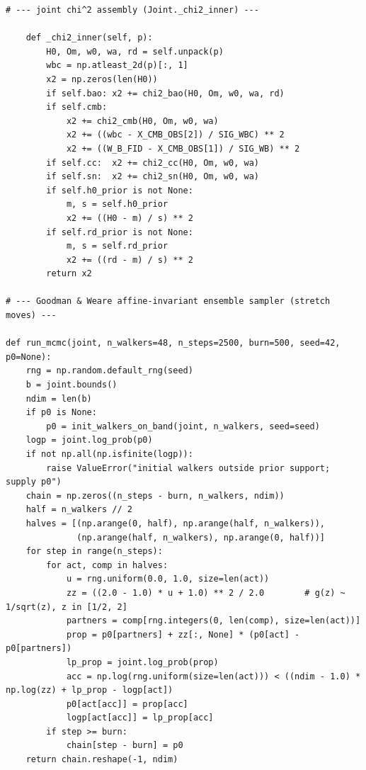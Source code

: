 \documentclass[aps,prd,preprint,superscriptaddress,nofootinbib]{revtex4-2}
\begin{document}
\begin{lstlisting}
# --- joint chi^2 assembly (Joint._chi2_inner) ---

    def _chi2_inner(self, p):
        H0, Om, w0, wa, rd = self.unpack(p)
        wbc = np.atleast_2d(p)[:, 1]
        x2 = np.zeros(len(H0))
        if self.bao: x2 += chi2_bao(H0, Om, w0, wa, rd)
        if self.cmb:
            x2 += chi2_cmb(H0, Om, w0, wa)
            x2 += ((wbc - X_CMB_OBS[2]) / SIG_WBC) ** 2
            x2 += ((W_B_FID - X_CMB_OBS[1]) / SIG_WB) ** 2
        if self.cc:  x2 += chi2_cc(H0, Om, w0, wa)
        if self.sn:  x2 += chi2_sn(H0, Om, w0, wa)
        if self.h0_prior is not None:
            m, s = self.h0_prior
            x2 += ((H0 - m) / s) ** 2
        if self.rd_prior is not None:
            m, s = self.rd_prior
            x2 += ((rd - m) / s) ** 2
        return x2

# --- Goodman & Weare affine-invariant ensemble sampler (stretch moves) ---

def run_mcmc(joint, n_walkers=48, n_steps=2500, burn=500, seed=42, p0=None):
    rng = np.random.default_rng(seed)
    b = joint.bounds()
    ndim = len(b)
    if p0 is None:
        p0 = init_walkers_on_band(joint, n_walkers, seed=seed)
    logp = joint.log_prob(p0)
    if not np.all(np.isfinite(logp)):
        raise ValueError("initial walkers outside prior support; supply p0")
    chain = np.zeros((n_steps - burn, n_walkers, ndim))
    half = n_walkers // 2
    halves = [(np.arange(0, half), np.arange(half, n_walkers)),
              (np.arange(half, n_walkers), np.arange(0, half))]
    for step in range(n_steps):
        for act, comp in halves:
            u = rng.uniform(0.0, 1.0, size=len(act))
            zz = ((2.0 - 1.0) * u + 1.0) ** 2 / 2.0        # g(z) ~ 1/sqrt(z), z in [1/2, 2]
            partners = comp[rng.integers(0, len(comp), size=len(act))]
            prop = p0[partners] + zz[:, None] * (p0[act] - p0[partners])
            lp_prop = joint.log_prob(prop)
            acc = np.log(rng.uniform(size=len(act))) < ((ndim - 1.0) * np.log(zz) + lp_prop - logp[act])
            p0[act[acc]] = prop[acc]
            logp[act[acc]] = lp_prop[acc]
        if step >= burn:
            chain[step - burn] = p0
    return chain.reshape(-1, ndim)
\end{lstlisting}
\end{document}
